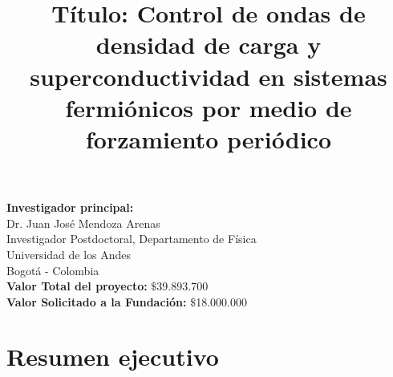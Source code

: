 \documentclass[a4paper,10pt]{article}
\title{\large{\textbf{T\'{i}tulo: Control de ondas de densidad de carga y superconductividad en sistemas fermi\'onicos por medio de forzamiento peri\'odico}}}
\date{}
\begin{document}
\maketitle

\setlength{\parindent}{0pt}

\textbf{Investigador principal:}\\
Dr. Juan Jos\'e Mendoza Arenas\\
Investigador Postdoctoral, Departamento de F\'{i}sica\\
Universidad de los Andes\\
Bogot\'a - Colombia\\

\textbf{Valor Total del proyecto:} $\$$39.893.700\\
\textbf{Valor Solicitado a la Fundaci\'on:} $\$$18.000.000

\newpage

\section{Resumen ejecutivo}
\end{document}
